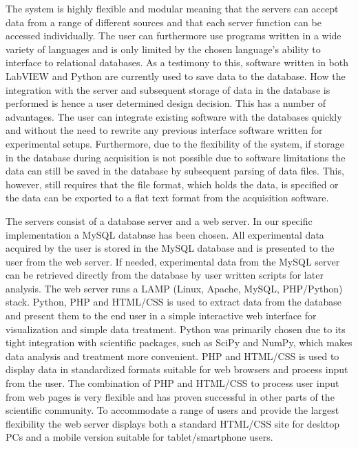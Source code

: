 The system is highly flexible and modular meaning that the servers can accept
data from a range of different sources and that each server function can be
accessed individually. The user can furthermore use programs written in a wide
variety of languages and is only limited by the chosen language's ability to
interface to relational databases. As a testimony to this, software written in
both LabVIEW and Python\cite{python} are currently used to save data to the
database. How the integration with the server and subsequent storage of data in
the database is performed is hence a user determined design decision. This has
a number of advantages. The user can integrate existing software with the
databases quickly and without the need to rewrite any previous interface
software written for experimental setups. Furthermore, due to the flexibility
of the system, if storage in the database during acquisition is not possible
due to software limitations the data can still be saved in the database by
subsequent parsing of data files. This, however, still requires that the file
format, which holds the data, is specified or the data can be exported to a
flat text format from the acquisition software.

The servers consist of a database server and a web server. In our specific
implementation a MySQL database has been chosen. All experimental data acquired
by the user is stored in the MySQL database and is presented to the user from
the web server. If needed, experimental data from the MySQL server can be
retrieved directly from the database by user written scripts for later
analysis. The web server runs a LAMP (Linux, Apache, MySQL, PHP/Python)
stack. Python, PHP and HTML/CSS is used to extract data from the database
and present them to the end user in a simple interactive web interface for
visualization and simple data treatment. Python was primarily chosen due
to its tight integration with scientific packages, such as SciPy and NumPy,
which makes data analysis and treatment more convenient\cite{Cahn2007}. PHP and
HTML/CSS is used to display data in standardized formats suitable for web
browsers and process input from the user. The combination of PHP and HTML/CSS
to process user input from web pages is very flexible and has proven successful
in other parts of the scientific community\cite{Crane2008}. To accommodate a
range of users and provide the largest flexibility the web server displays both
a standard HTML/CSS site for desktop PCs and a mobile version suitable for
tablet/smartphone users.


